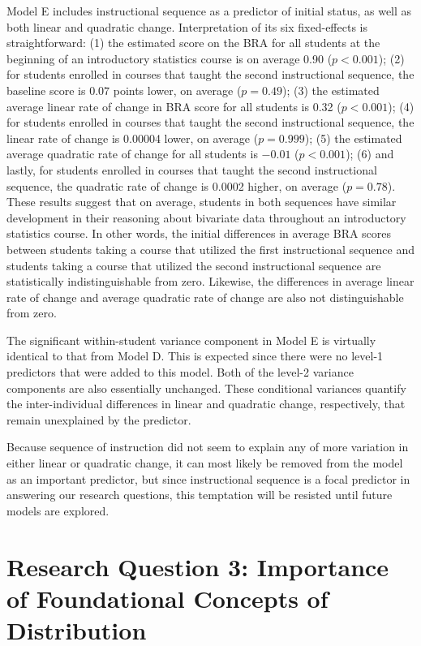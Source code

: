 \documentclass[11pt]{umnthesis}
\begin{document}
Model E includes instructional sequence as a predictor of initial status, as well as both linear and quadratic change. Interpretation of its six fixed-effects is straightforward: (1) the estimated score on the BRA for all students at the beginning of an introductory statistics course is on average 0.90 (\(p<0.001\)); (2) for students enrolled in courses that taught the second instructional sequence, the baseline score is \(0.07\) points lower, on average (\(p=0.49\)); (3) the estimated average linear rate of change in BRA score for all students is 0.32 (\(p<0.001\)); (4) for students enrolled in courses that taught the second instructional sequence, the linear rate of change is 0.00004 lower, on average (\(p=0.999\)); (5) the estimated average quadratic rate of change for all students is \(-0.01\) (\(p<0.001\)); (6) and lastly, for students enrolled in courses that taught the second instructional sequence, the quadratic rate of change is 0.0002 higher, on average (\(p=0.78\)). These results suggest that on average, students in both sequences have similar development in their reasoning about bivariate data throughout an introductory statistics course. In other words, the initial differences in average BRA scores between students taking a course that utilized the first instructional sequence and students taking a course that utilized the second instructional sequence are statistically indistinguishable from zero. Likewise, the differences in average linear rate of change and average quadratic rate of change are also not distinguishable from zero.

The significant within-student variance component in Model E is virtually identical to that from Model D. This is expected since there were no level-1 predictors that were added to this model. Both of the level-2 variance components are also essentially unchanged. These conditional variances quantify the inter-individual differences in linear and quadratic change, respectively, that remain unexplained by the predictor.

Because sequence of instruction did not seem to explain any of more variation in either linear or quadratic change, it can most likely be removed from the model as an important predictor, but since instructional sequence is a focal predictor in answering our research questions, this temptation will be resisted until future models are explored.

\hypertarget{research-question-3-importance-of-foundational-concepts-of-distribution}{%
\section{Research Question 3: Importance of Foundational Concepts of Distribution}\label{research-question-3-importance-of-foundational-concepts-of-distribution}}
\end{document}
